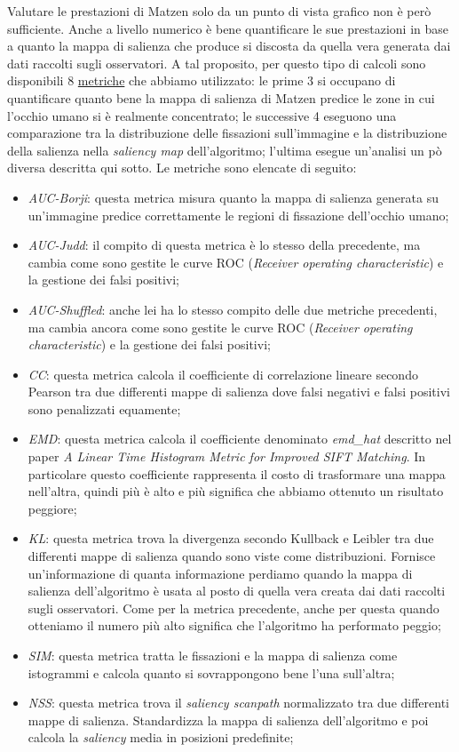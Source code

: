 \documentclass[%
	corpo=12pt,
    twoside,
    stile=classica,
    oldstyle,
    tipotesi=custom,
    greek,
    evenboxes,
]{toptesi}
\begin{document}
{Valutare le prestazioni di Matzen solo da un punto di vista grafico non è però sufficiente. Anche a livello numerico è bene quantificare le sue prestazioni in base a quanto la mappa di salienza che produce si discosta da quella vera generata dai dati raccolti sugli osservatori. A tal proposito, per questo tipo di calcoli sono disponibili 8 \href{http://saliency.mit.edu/results_mit300.html}{metriche} che abbiamo utilizzato:  le prime 3 si occupano di quantificare quanto bene la mappa di salienza di Matzen predice le zone in cui l'occhio umano si è realmente concentrato; le successive 4 eseguono una comparazione tra la distribuzione delle fissazioni sull'immagine e la distribuzione della salienza nella \textit{saliency map} dell'algoritmo; l'ultima esegue un'analisi un pò diversa descritta qui sotto. Le metriche sono elencate di seguito:
\begin{itemize}
\item \textit{AUC-Borji}: questa metrica misura quanto la mappa di salienza generata su un'immagine predice correttamente le regioni di fissazione dell'occhio umano;
\item \textit{AUC-Judd}: il compito di questa metrica è lo stesso della precedente, ma cambia come sono gestite le curve ROC (\textit{Receiver operating characteristic}) e la gestione dei falsi positivi; 
\item \textit{AUC-Shuffled}: anche lei ha lo stesso compito delle due metriche precedenti, ma cambia ancora come sono gestite le curve ROC (\textit{Receiver operating characteristic}) e la gestione dei falsi positivi; 
\item \textit{CC}: questa metrica calcola il coefficiente di correlazione lineare secondo Pearson tra due differenti mappe di salienza dove falsi negativi e falsi positivi sono penalizzati equamente; 
\item \textit{EMD}: questa metrica calcola il coefficiente denominato \textit{emd\_hat} descritto nel paper \textit{A Linear Time Histogram Metric for Improved SIFT Matching}. In particolare questo coefficiente rappresenta il costo di trasformare una mappa nell'altra, quindi più è alto e più significa che abbiamo ottenuto un risultato peggiore;
\item \textit{KL}: questa metrica trova la divergenza secondo Kullback e Leibler tra due differenti mappe di salienza quando sono viste come distribuzioni. Fornisce un'informazione di quanta informazione perdiamo quando la mappa di salienza dell'algoritmo è usata al posto di quella vera creata dai dati raccolti sugli osservatori. Come per la metrica precedente, anche per questa quando otteniamo il numero più alto significa che l'algoritmo ha performato peggio;
\item \textit{SIM}: questa metrica tratta le fissazioni e la mappa di salienza come istogrammi e calcola quanto si sovrappongono bene l'una sull'altra;
\item \textit{NSS}: questa metrica trova il \textit{saliency scanpath} normalizzato tra due differenti mappe di salienza. Standardizza la mappa di salienza dell'algoritmo e poi calcola la \textit{saliency} media in posizioni predefinite;
\end{itemize}

}
\end{document}
